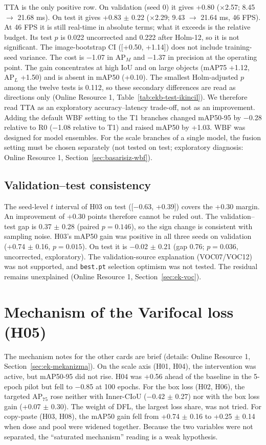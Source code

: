 \documentclass[pdflatex,iicol,sn-mathphys-num]{sn-jnl}
\begin{document}
TTA is the only positive row. On validation (seed 0) it gives +0.80 ($\times$2.57; 8.45 $\to$ 21.68 ms). On test it gives +0.83 $\pm$ 0.22 ($\times$2.29; 9.43 $\to$ 21.64 ms, 46 FPS). At 46 FPS it is still real-time in absolute terms; what it exceeds is the relative budget. Its test $p$ is 0.022 uncorrected and 0.222 after Holm-12, so it is not significant. The image-bootstrap CI ([+0.50, +1.14]) does not include training-seed variance. The cost is $-$1.07 in AP$_M$ and $-$1.37 in precision at the operating point. The gain concentrates at high IoU and on large objects (mAP75 +1.12, AP$_L$ +1.50) and is absent in mAP50 (+0.10). The smallest Holm-adjusted $p$ among the twelve tests is 0.112, so these secondary differences are read as directions only (Online Resource 1, Table~\ref{tab:ekb-test-ikincil}). We therefore read TTA as an exploratory accuracy--latency trade-off, not as an improvement. Adding the default WBF setting to the T1 branches changed mAP50-95 by $-$0.28 relative to R0 ($-$1.08 relative to T1) and raised mAP50 by +1.03. WBF was designed for model ensembles. For the scale branches of a single model, the fusion setting must be chosen separately (not tested on test; exploratory diagnosis: Online Resource 1, Section~\ref{sec:basarisiz-wbf}).

\subsection{Validation--test consistency}\label{sec:bulgu-tutarlilik}
The seed-level $t$ interval of H03 on test ([$-$0.63, +0.39]) covers the +0.30 margin. An improvement of +0.30 points therefore cannot be ruled out. The validation--test gap is 0.37 $\pm$ 0.28 (paired $p=0.146$), so the sign change is consistent with sampling noise. H03's mAP50 gain was positive in all three seeds on validation (+0.74 $\pm$ 0.16, $p=0.015$). On test it is $-$0.02 $\pm$ 0.21 (gap 0.76; $p=0.036$, uncorrected, exploratory). The validation-source explanation (VOC07/VOC12) was not supported, and \texttt{best.pt} selection optimism was not tested. The residual remains unexplained (Online Resource 1, Section~\ref{sec:ek-voc}).

\section{Mechanism of the Varifocal loss (H05)}\label{sec:basarisiz}\label{sec:h05}

The mechanism notes for the other cards are brief (details: Online Resource 1, Section~\ref{sec:ek-mekanizma}). On the scale axis (H01, H04), the intervention was active, but mAP50-95 did not rise. H04 was +0.56 ahead of the baseline in the 5-epoch pilot but fell to $-$0.85 at 100 epochs. For the box loss (H02, H06), the targeted AP$_{75}$ rose neither with Inner-CIoU ($-$0.42 $\pm$ 0.27) nor with the box loss gain (+0.07 $\pm$ 0.30). The weight of DFL, the largest loss share, was not tried. For copy-paste (H03, H08), the mAP50 gain fell from +0.74 $\pm$ 0.16 to +0.25 $\pm$ 0.14 when dose and pool were widened together. Because the two variables were not separated, the ``saturated mechanism'' reading is a weak hypothesis.
\end{document}
